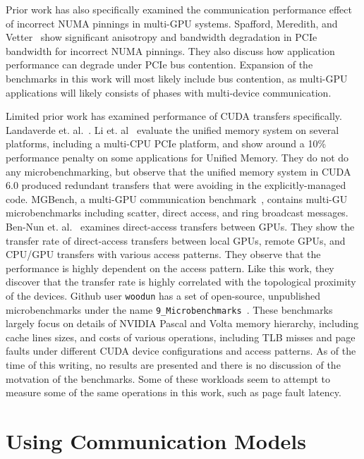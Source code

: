 Prior work has also specifically examined the communication performance effect of incorrect NUMA pinnings in multi-GPU systems.
Spafford, Meredith, and Vetter~\cite{spafford2011quantifying} show significant anisotropy and bandwidth degradation in PCIe bandwidth for incorrect NUMA pinnings.
They also discuss how application performance can degrade under PCIe bus contention.
Expansion of the benchmarks in this work will most likely include bus contention, as multi-GPU applications will likely consists of phases with multi-device communication.

Limited prior work has examined performance of CUDA transfers specifically.
Landaverde et. al.~\cite{landaverde2014investigation}.
Li et. al~\cite{li2015evaluation} evaluate the unified memory system on several platforms, including a multi-CPU PCIe platform, and show around a 10\% performance penalty on some applications for Unified Memory.
They do not do any microbenchmarking, but observe that the unified memory system in CUDA 6.0 produced redundant transfers that were avoiding in the explicitly-managed code.
MGBench, a multi-GPU communication benchmark~\cite{bennun2016mgbench}, contains multi-GU microbenchmarks including scatter, direct access, and ring broadcast messages.
Ben-Nun et. al.~\cite{ben2017groute} examines direct-access transfers between GPUs.
They show the transfer rate of direct-access transfers between local GPUs, remote GPUs, and CPU/GPU transfers with various access patterns.
They observe that the performance is highly dependent on the access pattern.
Like this work, they discover that the transfer rate is highly correlated with the topological proximity of the devices.
Github user \texttt{woodun} has a set of open-source, unpublished microbenchmarks under the name \texttt{9\_Microbenchmarks}~\cite{woodun2018microbenchmarks}.
These benchmarks largely focus on details of NVIDIA Pascal and Volta memory hierarchy, including cache lines sizes, and costs of various operations, including TLB misses and page faults under different CUDA device configurations and access patterns.
As of the time of this writing, no results are presented and there is no discussion of the motvation of the benchmarks.
Some of these workloads seem to attempt to measure some of the same operations in this work, such as page fault latency.

\section{Using Communication Models}

